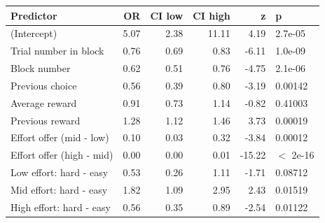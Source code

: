 \begin{table}[ht]
\centering
\begin{tabular}{lrrrrl}
  \hline
Predictor & OR & CI low & CI high & z & p \\ 
  \hline
(Intercept) & 5.07 & 2.38 & 11.11 & 4.19 & 2.7e-05 \\ 
  Trial number in block & 0.76 & 0.69 & 0.83 & -6.11 & 1.0e-09 \\ 
  Block number & 0.62 & 0.51 & 0.76 & -4.75 & 2.1e-06 \\ 
  Previous choice & 0.56 & 0.39 & 0.80 & -3.19 & 0.00142 \\ 
  Average reward & 0.91 & 0.73 & 1.14 & -0.82 & 0.41003 \\ 
  Previous reward & 1.28 & 1.12 & 1.46 & 3.73 & 0.00019 \\ 
  Effort offer (mid - low) & 0.10 & 0.03 & 0.32 & -3.84 & 0.00012 \\ 
  Effort offer (high - mid) & 0.00 & 0.00 & 0.01 & -15.22 & $<$ 2e-16 \\ 
  Low effort: hard - easy & 0.53 & 0.26 & 1.11 & -1.71 & 0.08712 \\ 
  Mid effort: hard - easy & 1.82 & 1.09 & 2.95 & 2.43 & 0.01519 \\ 
  High effort: hard - easy & 0.56 & 0.35 & 0.89 & -2.54 & 0.01122 \\ 
   \hline
\end{tabular}
\end{table}
